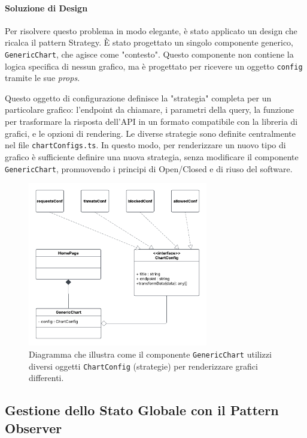 \documentclass[12pt,a4paper,openright,twoside]{book}
\begin{document}
\paragraph{Soluzione di Design}
Per risolvere questo problema in modo elegante, è stato applicato un design che ricalca il pattern Strategy. È stato progettato un singolo componente generico, \texttt{GenericChart}, che agisce come "contesto". Questo componente non contiene la logica specifica di nessun grafico, ma è progettato per ricevere un oggetto \texttt{config} tramite le sue \textit{props}.

Questo oggetto di configurazione definisce la "strategia" completa per un particolare grafico: l'endpoint da chiamare, i parametri della query, la funzione per trasformare la risposta dell'API in un formato compatibile con la libreria di grafici, e le opzioni di rendering. Le diverse strategie sono definite centralmente nel file \texttt{chartConfigs.ts}. In questo modo, per renderizzare un nuovo tipo di grafico è sufficiente definire una nuova strategia, senza modificare il componente \texttt{GenericChart}, promuovendo i principi di Open/Closed e di riuso del software.

\begin{figure}[htbp]
    \centering
    \includegraphics[width=0.7\textwidth]{figures/strategy.pdf}
    \caption{Diagramma che illustra come il componente \texttt{GenericChart} utilizzi diversi oggetti \texttt{ChartConfig} (strategie) per renderizzare grafici differenti.}
    \label{fig:strategy_frontend_uml}
\end{figure}

\FloatBarrier



\subsection{Gestione dello Stato Globale con il Pattern Observer}
\label{subsec:design_observer_frontend}
\end{document}
